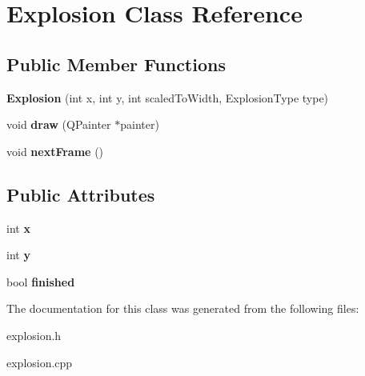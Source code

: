 \hypertarget{classExplosion}{}\section{Explosion Class Reference}
\label{classExplosion}
\subsection*{Public Member Functions}
\begin{DoxyCompactItemize}
\item 
\mbox{\label{classExplosion_a954e136bb5589816ca4e4d229ef5d289}} 
{\bfseries Explosion} (int x, int y, int scaled\+To\+Width, Explosion\+Type type)
\item 
\mbox{\label{classExplosion_a4d7a36e5766b1fd97767f6a45dac8965}} 
void {\bfseries draw} (Q\+Painter $\ast$painter)
\item 
\mbox{\label{classExplosion_ae484cce02bb4bed0d43f4078f0fb5406}} 
void {\bfseries next\+Frame} ()
\end{DoxyCompactItemize}
\subsection*{Public Attributes}
\begin{DoxyCompactItemize}
\item 
\mbox{\label{classExplosion_a13194cbd4c6e14352470e08960668205}} 
int {\bfseries x}
\item 
\mbox{\label{classExplosion_a4d0073207eefaa4d8369e32ce40fbab5}} 
int {\bfseries y}
\item 
\mbox{\label{classExplosion_a7c4233277e796d7ec8e94dbcf981ef22}} 
bool {\bfseries finished}
\end{DoxyCompactItemize}


The documentation for this class was generated from the following files\+:\begin{DoxyCompactItemize}
\item 
explosion.\+h\item 
explosion.\+cpp\end{DoxyCompactItemize}
